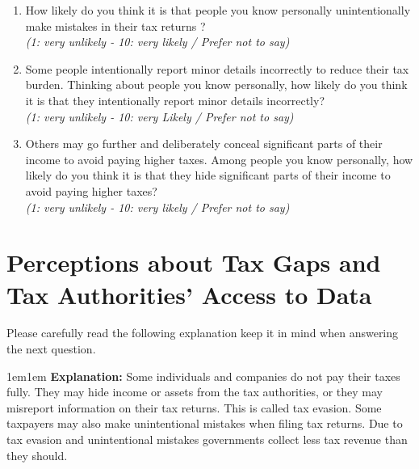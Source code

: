 \documentclass[11pt]{article}
\begin{document}
\begin{enumerate}[resume]
    \item How likely do you think it is that people you know personally unintentionally make mistakes in their tax returns ? \\
    \textit{(1: very unlikely - 10: very likely / Prefer not to say)}
    \item Some people intentionally report minor details incorrectly to reduce their tax burden. Thinking about people you know personally, how likely do you think it is that they intentionally report minor details incorrectly?\\
    \textit{(1: very unlikely - 10: very Likely / Prefer not to say)}
    \item Others may go further and deliberately conceal significant parts of their income to avoid paying higher taxes. Among people you know personally, how likely do you think it is that they hide significant parts of their income to avoid paying higher taxes?\\
    \textit{(1: very unlikely - 10: very likely / Prefer not to say)}
\end{enumerate}
\section*{Perceptions about Tax Gaps and Tax Authorities' Access to Data}
\noindent Please carefully read the following explanation keep it in mind when answering the next question. \\
\begin{adjustwidth}{1em}{1em} \textbf{Explanation:} Some individuals and companies do not pay their taxes fully. They may hide income or assets from the tax authorities, or they may misreport information on their tax returns. This is called tax evasion. Some taxpayers may also make unintentional mistakes when filing tax returns. Due to tax evasion and unintentional mistakes governments collect less tax revenue than they should. 

\end{adjustwidth}
\end{document}
